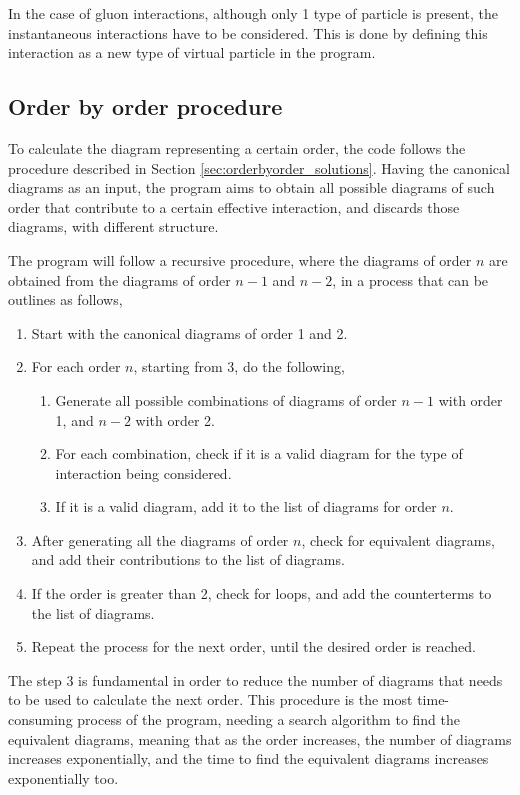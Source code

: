 \documentclass[11pt,a4paper,twoside,pdf]{article}
\numberwithin{equation}{section}
\begin{document}
In the case of gluon interactions, although only 1 type of particle is present, the
instantaneous interactions have to be considered. This is done by defining this 
interaction as a new type of virtual particle in the program.

\subsection{Order by order procedure}

To calculate the diagram representing a certain order, the code follows the 
procedure described in Section \ref{sec:orderbyorder_solutions}. Having the
canonical diagrams as an input, the program aims to obtain all possible diagrams of such order
that contribute to a certain effective interaction, and discards those diagrams, with
different structure.

The program will follow a recursive procedure, where the diagrams of order $n$ are
obtained from the diagrams of order $n-1$ and $n-2$, in a process that can be outlines
as follows,

\begin{enumerate}
    \item Start with the canonical diagrams of order 1 and 2.
    \item For each order $n$, starting from 3, do the following,
    \begin{enumerate}
        \item Generate all possible combinations of diagrams of order $n-1$ with
        order 1, and $n-2$ with order 2.
        \item For each combination, check if it is a valid diagram for the type of interaction
        being considered.
        \item If it is a valid diagram, add it to the list of diagrams for order $n$.
    \end{enumerate}
    \item After generating all the diagrams of order $n$, check for equivalent diagrams,
    and add their contributions to the list of diagrams.
    \item If the order is greater than 2, check for loops, and add the counterterms 
    to the list of diagrams.
    \item Repeat the process for the next order, until the desired order is reached.
\end{enumerate}

The step 3 is fundamental in order to reduce the number of diagrams that needs to 
be used to calculate the next order. This procedure is the most time-consuming process 
of the program, needing a search algorithm to find the equivalent diagrams, meaning 
that as the order increases, the number of diagrams increases exponentially, and the 
time to find the equivalent diagrams increases exponentially too. 
\end{document}
